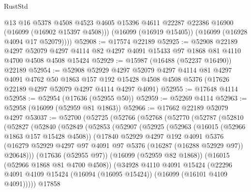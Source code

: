 \begin{lexlean}{RustStd}
\begin{coremodule}
          @13
          @16
          @5378
          @4508
          @4523
          @4605
          @15396
          @4611
          @22287
          @22386
          @16900
          (@16099 (@16902 @15397 @4508)))
        (@16099 (@16919 @15405))
        (@16099 (@16928 @4094 @17 @52079))))
@52908 := @17574 @22189
@52925 := @52908
    @22189
    @4297
    @52079
    @4297
    @4114
    @82
    @4297
    @4091
    @15433
    @97
    @1868
    @81
    @4110
    @4700
    @4508
    @4508
    @15424
@52929 := @15987 (@16488 (@52237 @16490)) @22189
@52954 := @52908
    @52929
    @4297
    @52079
    @4297
    @4114
    @81
    @4297
    @4091
    @4762
    @50
    @1863
    @157
    @192
    @15428
    @4508
    @4508
    @5376
    (@17626 @22189 @4297 @52079 @4297 @4114 @4297 @4091)
@52955 := @17648 @4114
@52958 := @52954 (@17636 (@52955 @50))
@52959 := @52269 @4114
@52963 := @52958 (@16099 (@52959 @81 @1863))
@52966 := @17662 @22189 @52079 @4297
@53037 := @52700
    (@52725
      (@52766
        (@52768
          (@52770
            (@52787
              (@52810
                (@52827
                  (@52840
                    (@52849
                      (@52853
                        (@52907
                          (@52925
                            (@52963
                              (@16015 (@52966 @1863 @157 @15428 @4508))
                              (@17840
                                @52929
                                @4297
                                @192
                                @4091
                                @5376
                                (@16279
                                  @52929
                                  @4297
                                  @97
                                  @4091
                                  @97
                                  @5376
                                  (@16287 (@16288 @52929 @97))
                                  @20648)))
                            (@17636 (@52955 @97))
                            (@16099 (@52959 @82 @1868))
                            (@16015 (@52966 @1868 @81 @4700 @4508))
                            (@34928
                              @4110
                              @4091
                              @15424
                              (@22296
                                @4091
                                @4109
                                @15424
                                (@16094 (@16095 @15424))
                                (@16099 (@16101 @4109 @4091)))))
                          @17858

\end{coremodule}
\end{lexlean}
